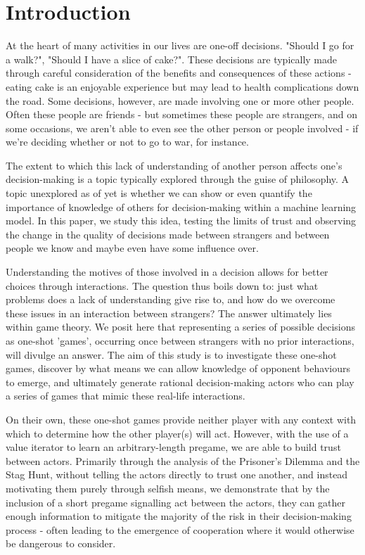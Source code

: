 \chapter{Introduction}\label{C:intro}

At the heart of many activities in our lives are one-off decisions. "Should I go for a walk?", "Should I have a slice of cake?". These decisions are typically made through careful consideration of the benefits and consequences of these actions - eating cake is an enjoyable experience but may lead to health complications down the road. Some decisions, however, are made involving one or more other people. Often these people are friends - but sometimes these people are strangers, and on some occasions, we aren't able to even see the other person or people involved - if we're deciding whether or not to go to war, for instance. 

The extent to which this lack of understanding of another person affects one's decision-making is a topic typically explored through the guise of philosophy. A topic unexplored as of yet is whether we can show or even quantify the importance of knowledge of others for decision-making within a machine learning model. In this paper, we study this idea, testing the limits of trust and observing the change in the quality of decisions made between strangers and between people we know and maybe even have some influence over.

Understanding the motives of those involved in a decision allows for better choices through interactions. The question thus boils down to: just what problems does a lack of understanding give rise to, and how do we overcome these issues in an interaction between strangers? The answer ultimately lies within game theory. We posit here that representing a series of possible decisions as one-shot 'games', occurring once between strangers with no prior interactions, will divulge an answer. The aim of this study is to investigate these one-shot games, discover by what means we can allow knowledge of opponent behaviours to emerge, and ultimately generate rational decision-making actors who can play a series of games that mimic these real-life interactions. 

On their own, these one-shot games provide neither player with any context with which to determine how the other player(s) will act. However, with the use of a value iterator to learn an arbitrary-length pregame, we are able to build trust between actors. Primarily through the analysis of the Prisoner's Dilemma and the Stag Hunt, without telling the actors directly to trust one another, and instead motivating them purely through selfish means, we demonstrate that by the inclusion of a short pregame signalling act between the actors, they can gather enough information to mitigate the majority of the risk in their decision-making process - often leading to the emergence of cooperation where it would otherwise be dangerous to consider. 
